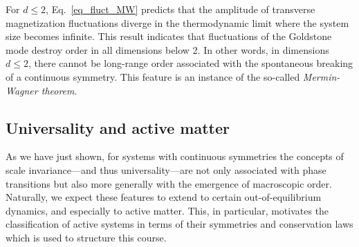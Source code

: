 %

For $d \le 2$, Eq.~\eqref{eq_fluct_MW} predicts that the amplitude of transverse magnetization fluctuations diverge in the thermodynamic limit where the system size becomes infinite.
This result indicates that fluctuations of the Goldstone mode destroy order in all dimensions below 2. 
In other words, in dimensions $d \leq 2$, there cannot be long-range order associated with the spontaneous breaking of a continuous symmetry.
This feature is an instance of the so-called \emph{Mermin-Wagner theorem}.

\subsection*{Universality and active matter}

As we have just shown, for systems with continuous symmetries the concepts of scale invariance---and thus universality---are not only associated with phase transitions but also more generally with the emergence of macroscopic order.
Naturally, we expect these features to extend to certain out-of-equilibrium dynamics, and especially to active matter.
This, in particular, motivates the classification of active systems in terms of their symmetries and conservation laws which is used to structure this course.


